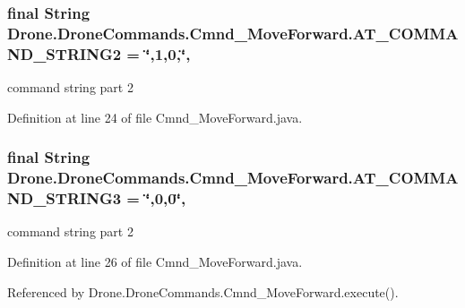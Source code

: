 \subsubsection[{A\+T\+\_\+\+C\+O\+M\+M\+A\+N\+D\+\_\+\+S\+T\+R\+I\+N\+G2}]{\setlength{\rightskip}{0pt plus 5cm}final String Drone.\+Drone\+Commands.\+Cmnd\+\_\+\+Move\+Forward.\+A\+T\+\_\+\+C\+O\+M\+M\+A\+N\+D\+\_\+\+S\+T\+R\+I\+N\+G2 = \char`\"{},1,0,\char`\"{}\hspace{0.3cm}{\ttfamily [static]}, {\ttfamily [private]}}\label{class_drone_1_1_drone_commands_1_1_cmnd___move_forward_a240220ee21e1d03dc805aeff576ef791}
command string part 2 

Definition at line 24 of file Cmnd\+\_\+\+Move\+Forward.\+java.

\hypertarget{class_drone_1_1_drone_commands_1_1_cmnd___move_forward_ac1b3627bfc7ebce7bc609ba28082efae}{}
\subsubsection[{A\+T\+\_\+\+C\+O\+M\+M\+A\+N\+D\+\_\+\+S\+T\+R\+I\+N\+G3}]{\setlength{\rightskip}{0pt plus 5cm}final String Drone.\+Drone\+Commands.\+Cmnd\+\_\+\+Move\+Forward.\+A\+T\+\_\+\+C\+O\+M\+M\+A\+N\+D\+\_\+\+S\+T\+R\+I\+N\+G3 = \char`\"{},0,0\char`\"{}\hspace{0.3cm}{\ttfamily [static]}, {\ttfamily [private]}}\label{class_drone_1_1_drone_commands_1_1_cmnd___move_forward_ac1b3627bfc7ebce7bc609ba28082efae}
command string part 2 

Definition at line 26 of file Cmnd\+\_\+\+Move\+Forward.\+java.



Referenced by Drone.\+Drone\+Commands.\+Cmnd\+\_\+\+Move\+Forward.\+execute().

\hypertarget{class_drone_1_1_drone_commands_1_1_cmnd___move_forward_aec6387076f3e78a7295606c2473da639}{}
